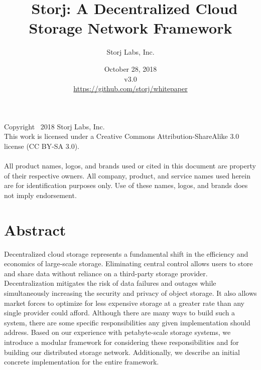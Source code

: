 \documentclass[8pt,fleqn,openany]{book}
\title{\textbf{\sffamily\color{white} \
Storj: A Decentralized Cloud Storage Network Framework}}
\author{\small\sffamily\color{white}
Storj Labs, Inc.}
\date{\small\sffamily\color{white} October 28, 2018\\v3.0\\
\small\colorlet{urllinkcolor}{white}\url{https://github.com/storj/whitepaper}
}
\begin{document}
\raggedbottom
{}

\thispagestyle{fancy}

\maketitle



\vfill{\footnotesize\noindent{}Copyright \textcopyright\ 2018 Storj Labs, Inc.\\
This work is licensed under a Creative Commons Attribution-ShareAlike 3.0
license (CC BY-SA 3.0).\\\\
All product names, logos, and brands used or cited in this document are
property of their respective owners. All company, product, and service names
used herein are for identification purposes only. Use of these names, logos,
and brands does not imply endorsement.}

\newpage

\tableofcontents\newpage

\section{Abstract}

Decentralized cloud storage represents a fundamental shift in
the efficiency and economics of large-scale storage.
Eliminating central control allows users to store and share data
without reliance on a third-party storage provider. Decentralization mitigates
the risk of data failures and outages while simultaneously increasing
the security and privacy of object storage. It also
allows market forces to optimize for less expensive storage
at a greater rate than any single provider could afford.
Although there are many ways to build such a system, there are some specific
responsibilities any given implementation should address.
Based on our experience with petabyte-scale
storage systems, we introduce a modular framework for considering these
responsibilities and for building our distributed storage network.
Additionally, we describe an initial
concrete implementation for the entire framework.
\end{document}
